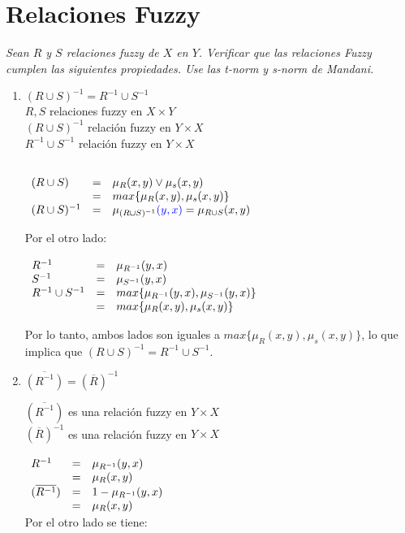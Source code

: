 \documentclass[letterpaper,spanish,11pt]{article}
\begin{document}
\section{Relaciones Fuzzy}
\emph{Sean $R$ y $S$ relaciones fuzzy de $X$ en $Y$. Verificar que las relaciones
Fuzzy cumplen las siguientes propiedades. Use las t-norm y s-norm de Mandani.}

\begin{enumerate}
\item $(R \cup S )^{-1} = R^{-1} \cup S^{-1}$\\
$R,S$ relaciones fuzzy en $X\times Y$\\
$(R\cup S)^{-1}$ relaci\'{o}n fuzzy en $Y\times X$\\
$R^{-1}\cup S^{-1}$ relaci\'{o}n fuzzy en $Y\times X$



$\begin{array}{l l l}\\
(R \cup S ) &= &\mu_{R}(x,y) \vee \mu_{s}(x,y)\\
 &= &max\{\mu_{R}(x,y),\mu_{s}(x,y)\}\\
(R \cup S )^{-1} &= & \mu_{(R\cup S)^{-1}}\textcolor{blue}{(y,x)} = \mu_{R\cup S}(x,y)\\
\end{array}$

Por el otro lado:\\

$\begin{array}{l l l}\\
R^{-1} &= &\mu_{R^{-1}}(y,x)\\
S^{-1} &= &\mu_{S^{-1}}(y,x)\\
R^{-1} \cup S^{-1}  &= &max\{\mu_{R^{-1}}(y,x),\mu_{S^{-1}}(y,x)\}\\
 &= & max\{\mu_{R}(x,y),\mu_{s}(x,y)\}
\end{array}$

Por lo tanto, ambos lados son iguales a $max\{\mu_{R}(x,y),\mu_{s}(x,y)\}$, lo
que implica que $(R \cup S )^{-1} = R^{-1} \cup S^{-1}$.

\item $\overline{(R^{-1})} = (\overline{R})^{-1}$


$(\overline{R^{-1}})$ es una relaci\'{o}n fuzzy en $Y\times X$\\
$(\overline{R})^{-1}$ es una relaci\'{o}n fuzzy en $Y\times X$\\

$\begin{array}{l l l }\\
 R^{-1} &= &\mu_{R^{-1}}(y,x)\\
 &= &\mu_{R}(x,y) \\
(\overline{R^{-1}}) &= & 1- \mu_{R^{-1}}(y,x) \\
 &= & \mu_{R}(x,y)\\
\end{array}$\\
Por el otro lado se tiene:


\end{enumerate}
\end{document}
